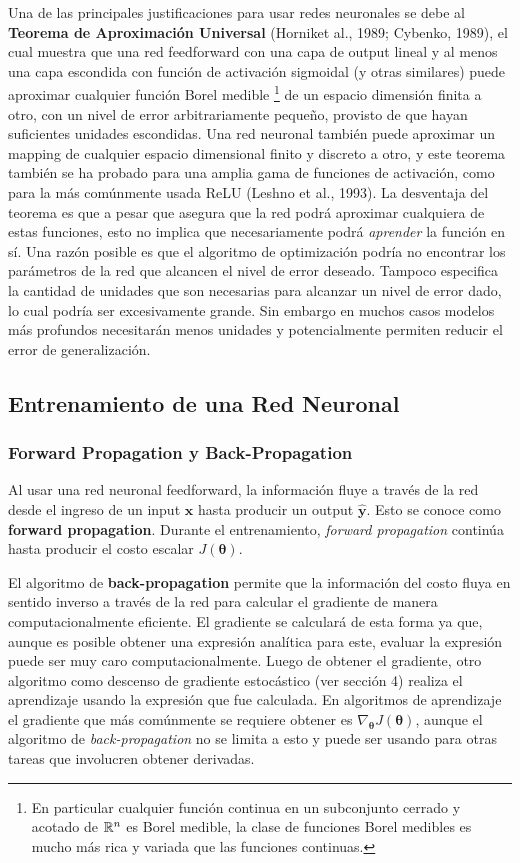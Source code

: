 Una de las principales justificaciones para usar redes neuronales se debe al \textbf{Teorema de Aproximaci\'on Universal} (Horniket al., 1989; Cybenko, 1989), el cual muestra que una red feedforward con una capa de output lineal y al menos una capa escondida con funci\'on de activaci\'on sigmoidal (y otras similares) puede aproximar cualquier funci\'on Borel medible \footnote{En particular cualquier funci\'on continua en un subconjunto cerrado y acotado de ${\mathbb R}^{n}$ es Borel medible, la clase de funciones Borel medibles es mucho más rica y variada que las funciones continuas.} de un espacio dimensión finita a otro, con un nivel de error arbitrariamente pequeño, provisto de que hayan suficientes unidades escondidas. Una red neuronal tambi\'en puede aproximar un mapping de cualquier espacio dimensional finito y discreto a otro, y este teorema tambi\'en se ha probado para una amplia gama de funciones de activaci\'on, como para la m\'as com\'unmente usada ReLU (Leshno et al., 1993). La desventaja del teorema es que a pesar que asegura que la red podr\'a aproximar cualquiera de estas funciones, esto no implica que necesariamente podr\'a \textit{aprender} la funci\'on en sí. Una razón posible es que el algoritmo de optimizaci\'on podr\'ia no encontrar los par\'ametros de la red que alcancen el nivel de error deseado. Tampoco especifica la cantidad de unidades que son necesarias para alcanzar un nivel de error dado, lo cual podr\'ia ser excesivamente grande. Sin embargo en muchos casos modelos m\'as profundos necesitar\'an menos unidades y potencialmente permiten reducir el error de generalizaci\'on.

\subsection{Entrenamiento de una Red Neuronal}

\subsubsection{Forward Propagation y Back-Propagation}

Al usar una red neuronal feedforward, la informaci\'on fluye a trav\'es de la red desde el ingreso de un input $\bm{x}$ hasta producir un output $\hat{\bm{y}}$. Esto se conoce como \textbf{forward propagation}. Durante el entrenamiento, \textit{forward propagation} contin\'ua hasta producir el costo escalar $J(\bm{\theta})$.

El algoritmo de \textbf{back-propagation} permite que la informaci\'on del costo fluya en sentido inverso a trav\'es de la red para calcular el gradiente de manera computacionalmente eficiente. El gradiente se calculará de esta forma ya que, aunque es posible obtener una expresi\'on anal\'itica para este, evaluar la expresi\'on puede ser muy caro computacionalmente. Luego de obtener el gradiente, otro algoritmo como descenso de gradiente estoc\'astico (ver secci\'on 4) realiza el aprendizaje usando la expresión que fue calculada. En algoritmos de aprendizaje el gradiente que m\'as com\'unmente se requiere obtener es $\nabla_{\bm{\theta}}J(\bm{\theta})$, aunque el algoritmo de \textit{back-propagation} no se limita a esto y puede ser usando para otras tareas que involucren obtener derivadas.

